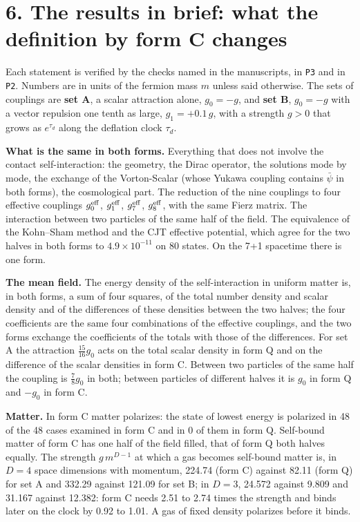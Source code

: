 \documentclass[
  10pt,
]{article}
\begin{document}
\hypertarget{the-results-in-brief-what-the-definition-by-form-c-changes}{%
\section{6. The results in brief: what the definition by form C
changes}\label{the-results-in-brief-what-the-definition-by-form-c-changes}}

Each statement is verified by the checks named in the manuscripts, in
\texttt{P3} and in \texttt{P2}. Numbers are in units of the fermion mass
\(m\) unless said otherwise. The sets of couplings are \textbf{set A}, a
scalar attraction alone, \(g_0=-g\), and \textbf{set B}, \(g_0=-g\) with
a vector repulsion one tenth as large, \(g_1=+0.1\,g\), with a strength
\(g>0\) that grows as \(e^{\tau_d}\) along the deflation clock
\(\tau_d\).

\textbf{What is the same in both forms.} Everything that does not
involve the contact self-interaction: the geometry, the Dirac operator,
the solutions mode by mode, the exchange of the Vorton-Scalar (whose
Yukawa coupling contains \(\bar\psi\) in both forms), the cosmological
part. The reduction of the nine couplings to four effective couplings
\(g_0^{\rm eff}\), \(g_1^{\rm eff}\), \(g_7^{\rm eff}\),
\(g_8^{\rm eff}\), with the same Fierz matrix. The interaction between
two particles of the same half of the field. The equivalence of the
Kohn--Sham method and the CJT effective potential, which agree for the
two halves in both forms to \(4.9\times10^{-11}\) on 80 states. On the
7+1 spacetime there is one form.

\textbf{The mean field.} The energy density of the self-interaction in
uniform matter is, in both forms, a sum of four squares, of the total
number density and scalar density and of the differences of these
densities between the two halves; the four coefficients are the same
four combinations of the effective couplings, and the two forms exchange
the coefficients of the totals with those of the differences. For set A
the attraction \(\tfrac{15}{16}g_0\) acts on the total scalar density in
form Q and on the difference of the scalar densities in form C. Between
two particles of the same half the coupling is \(\tfrac78g_0\) in both;
between particles of different halves it is \(g_0\) in form Q and
\(-g_0\) in form C.

\textbf{Matter.} In form C matter polarizes: the state of lowest energy
is polarized in 48 of the 48 cases examined in form C and in 0 of them
in form Q. Self-bound matter of form C has one half of the field filled,
that of form Q both halves equally. The strength \(g\,m^{D-1}\) at which
a gas becomes self-bound matter is, in \(D=4\) space dimensions with
momentum, 224.74 (form C) against 82.11 (form Q) for set A and 332.29
against 121.09 for set B; in \(D=3\), 24.572 against 9.809 and 31.167
against 12.382: form C needs 2.51 to 2.74 times the strength and binds
later on the clock by 0.92 to 1.01. A gas of fixed density polarizes
before it binds.
\end{document}
